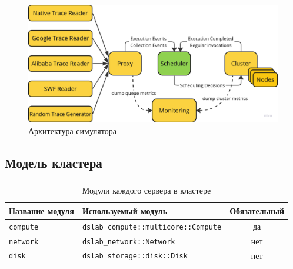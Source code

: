 \documentclass[t]{beamer}  %
\begin{document}
	\begin{frame}[fragile]
		\frametitle{\insertsection} 
		\framesubtitle{\insertsubsection}
		
		\vspace{0.5cm}
\begin{figure}[H]
	\includegraphics[width=\linewidth]{images/cluster-design-colored}
	\vspace{0.2cm}
	\caption*{Архитектура симулятора}
\end{figure}

	\end{frame}


	\subsection{Модель кластера}

	\begin{frame}[fragile]
		\frametitle{\insertsection} 
		\framesubtitle{\insertsubsection}


		\vspace{1.5cm}
\begin{table}[H]
	\footnotesize
    \centering
    \begin{tabular}{|l|l|c|}
    \hline
    \textbf{Название модуля} & \textbf{Используемый модуль} & \textbf{Обязательный} \\
    \hline
    \texttt{compute} & \texttt{dslab\_compute::multicore::Compute} & да \\
    \hline
    \texttt{network} & \texttt{dslab\_network::Network} & нет  \\
    \hline
    \texttt{disk} & \texttt{dslab\_storage::disk::Disk} & нет \\
    \hline
    \end{tabular}
    \caption*{Модули каждого сервера в кластере}
    \label{tab:server_modules}
\end{table}
\end{frame}
\end{document}
